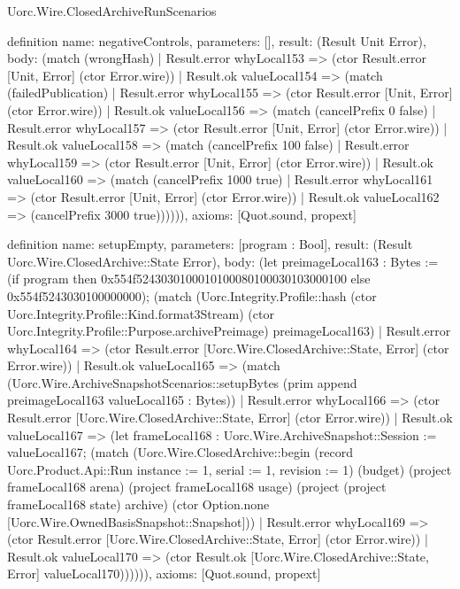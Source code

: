 \begin{lexlean}{Uorc.Wire.ClosedArchiveRunScenarios}
\begin{semanticmodule}
definition{
  name: negativeControls,
  parameters: [],
  result: (Result Unit Error),
  body: (match (wrongHash)
    | Result.error whyLocal153 => (ctor Result.error [Unit, Error] (ctor Error.wire))
    | Result.ok valueLocal154 => (match (failedPublication)
      | Result.error whyLocal155 => (ctor Result.error [Unit, Error] (ctor Error.wire))
      | Result.ok valueLocal156 => (match (cancelPrefix 0 false)
        | Result.error whyLocal157 => (ctor Result.error [Unit, Error] (ctor Error.wire))
        | Result.ok valueLocal158 => (match (cancelPrefix 100 false)
          | Result.error whyLocal159 => (ctor Result.error [Unit, Error] (ctor Error.wire))
          | Result.ok valueLocal160 => (match (cancelPrefix 1000 true)
            | Result.error whyLocal161 => (ctor Result.error [Unit, Error] (ctor Error.wire))
            | Result.ok valueLocal162 => (cancelPrefix 3000 true)))))),
  axioms: [Quot.sound, propext]
}

definition{
  name: setupEmpty,
  parameters: [program : Bool],
  result: (Result Uorc.Wire.ClosedArchive::State Error),
  body: (let preimageLocal163 : Bytes := (if program then 0x554f5243030100010100080100030103000100 else 0x554f5243030100000000); (match (Uorc.Integrity.Profile::hash (ctor Uorc.Integrity.Profile::Kind.format3Stream) (ctor Uorc.Integrity.Profile::Purpose.archivePreimage) preimageLocal163)
    | Result.error whyLocal164 => (ctor Result.error [Uorc.Wire.ClosedArchive::State, Error] (ctor Error.wire))
    | Result.ok valueLocal165 => (match (Uorc.Wire.ArchiveSnapshotScenarios::setupBytes (prim append preimageLocal163 valueLocal165 : Bytes))
      | Result.error whyLocal166 => (ctor Result.error [Uorc.Wire.ClosedArchive::State, Error] (ctor Error.wire))
      | Result.ok valueLocal167 => (let frameLocal168 : Uorc.Wire.ArchiveSnapshot::Session := valueLocal167; (match (Uorc.Wire.ClosedArchive::begin (record Uorc.Product.Api::Run {instance := 1, serial := 1, revision := 1}) (budget) (project frameLocal168 arena) (project frameLocal168 usage) (project (project frameLocal168 state) archive) (ctor Option.none [Uorc.Wire.OwnedBasisSnapshot::Snapshot]))
        | Result.error whyLocal169 => (ctor Result.error [Uorc.Wire.ClosedArchive::State, Error] (ctor Error.wire))
        | Result.ok valueLocal170 => (ctor Result.ok [Uorc.Wire.ClosedArchive::State, Error] valueLocal170)))))),
  axioms: [Quot.sound, propext]
}


\end{semanticmodule}
\end{lexlean}
